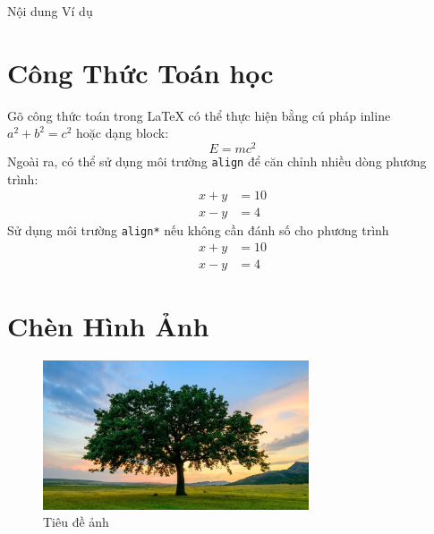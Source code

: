 \begin{vd}
    Nội dung Ví dụ
\end{vd}

\section{Công Thức Toán học}

Gõ công thức toán trong LaTeX có thể thực hiện bằng cú pháp inline $a^2 + b^2 = c^2$ hoặc dạng block:
\begin{equation}
    E = mc^2
\end{equation}
Ngoài ra, có thể sử dụng môi trường \texttt{align} để căn chỉnh nhiều dòng phương trình:
\begin{align}
    x + y &= 10 \\
    x - y &= 4
\end{align}
Sử dụng môi trường \texttt{align*} nếu không cần đánh số cho phương trình
\begin{align*}
    x + y &= 10 \\
    x - y &= 4
\end{align*}

\section{Chèn Hình Ảnh}

\begin{figure}[h!]
\includegraphics[width=0.7\textwidth]{Images/tree.jpg}
    \centering
    \caption{Tiêu đề ảnh}
    \label{Hình 1}
\end{figure}

\newpage


\nocite{*}

